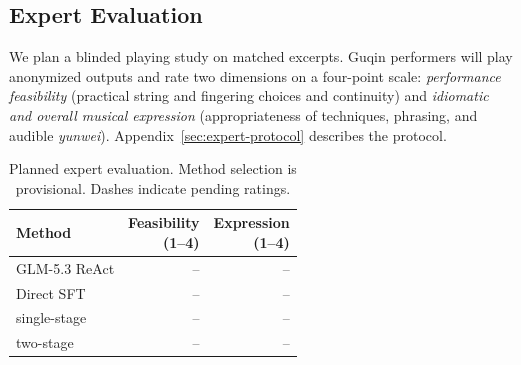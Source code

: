 \subsection{Expert Evaluation}\label{sec:expert-evaluation}
We plan a blinded playing study on matched excerpts. Guqin performers will play anonymized outputs and rate two dimensions on a four-point scale: \emph{performance feasibility} (practical string and fingering choices and continuity) and \emph{idiomatic and overall musical expression} (appropriateness of techniques, phrasing, and audible \emph{yunwei}). Appendix~\ref{sec:expert-protocol} describes the protocol.

\begin{table}[t]
\centering\small
\begin{tabularx}{\columnwidth}{@{}Xrr@{}}
\toprule
Method & \shortstack{Feasibility\\(1--4)} & \shortstack{Expression\\(1--4)} \\
\midrule
GLM-5.3 ReAct & -- & -- \\
Direct SFT & -- & -- \\
\system{} single-stage & -- & -- \\
\system{} two-stage & -- & -- \\
\bottomrule
\end{tabularx}
\caption{Planned expert evaluation. Method selection is provisional. Dashes indicate pending ratings.}
\label{tab:expert-evaluation}
\end{table}

